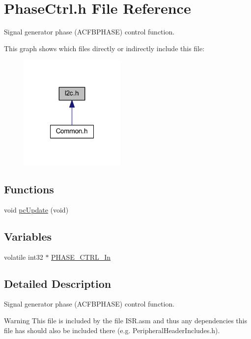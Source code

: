 \hypertarget{a00022}{\section{Phase\-Ctrl.\-h File Reference}
\label{a00022}
}


Signal generator phase (A\-C\-F\-B\-P\-H\-A\-S\-E) control function.  


This graph shows which files directly or indirectly include this file\-:\nopagebreak
\begin{figure}[H]
\begin{center}
\leavevmode
\includegraphics[width=148pt]{a00049}
\end{center}
\end{figure}
\subsection*{Functions}
\begin{DoxyCompactItemize}
\item 
void \hyperlink{a00022_a2aab767cee769a114c9e2ab25771e447}{pc\-Update} (void)
\end{DoxyCompactItemize}
\subsection*{Variables}
\begin{DoxyCompactItemize}
\item 
volatile int32 $\ast$ \hyperlink{a00022_ac286d0874ebba5141e36971f4a7f106e}{P\-H\-A\-S\-E\-\_\-\-C\-T\-R\-L\-\_\-\-In}
\end{DoxyCompactItemize}


\subsection{Detailed Description}
Signal generator phase (A\-C\-F\-B\-P\-H\-A\-S\-E) control function. \begin{DoxyWarning}{Warning}
This file is included by the file I\-S\-R.\-asm and thus any dependencies this file has should also be included there (e.\-g. Peripheral\-Header\-Includes.\-h). 
\end{DoxyWarning}


